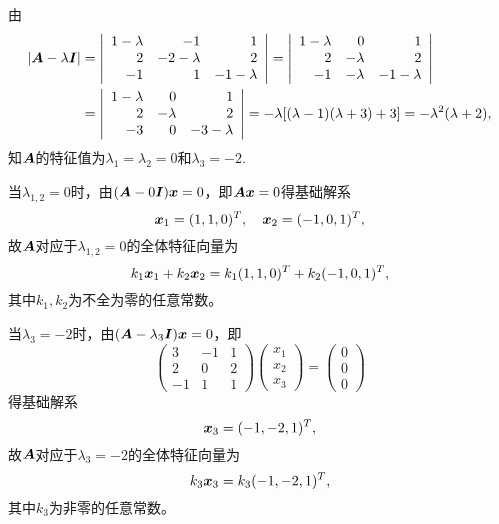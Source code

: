 \begin{frame}\ft{\subsecname}  

\begin{jie}
  由
  $$
  \begin{aligned}
    |\boldsymbol{A}-\lambda\boldsymbol{I}|&=\left|
      \begin{array}{rrr}
        1-\lambda&-1&1\\
        2&-2-\lambda&2\\
        -1&1&-1-\lambda
      \end{array}
  \right|=\left|
    \begin{array}{rrr}
      1-\lambda&0&1\\
        2&-\lambda&2\\
        -1&-\lambda&-1-\lambda
    \end{array}
  \right|\\
  &=\left|
    \begin{array}{rrr}
      1-\lambda&0&1\\
      2&-\lambda&2\\
      -3&0&-3-\lambda
    \end{array}
  \right|=-\lambda[(\lambda-1)(\lambda+3)+3]=-\lambda^2(\lambda+2),
\end{aligned}
$$
知$\boldsymbol{A}$的特征值为$\lambda_1=\lambda_2=0$和$\lambda_3=-2$.

当$\lambda_{1,2}=0$时，由$(\boldsymbol{A}-0\boldsymbol{I}){\boldsymbol{x}}=0$，即$\boldsymbol{A}{\boldsymbol{x}}=0$得基础解系
$$
{\boldsymbol{x}}_1=(1,1,0)^T, \quad {\boldsymbol{x}}_2=(-1,0,1)^T,
$$
故$\boldsymbol{A}$对应于$\lambda_{1,2}=0$的全体特征向量为
$$
k_1{\boldsymbol{x}}_1+k_2{\boldsymbol{x}}_2=k_1(1,1,0)^T+k_2(-1,0,1)^T,
$$
其中$k_1,k_2$为不全为零的任意常数。


当$\lambda_{3}=-2$时，由$(\boldsymbol{A}-\lambda_{3}\boldsymbol{I}){\boldsymbol{x}}=0$，即
$$
\left(
  \begin{array}{rrr}
    3&-1&1\\
    2&0&2\\
    -1&1&1
  \end{array}
\right)\left(
  \begin{array}{c}
    x_1\\x_2\\x_3
  \end{array}
\right)=\left(
  \begin{array}{c}
    0\\0\\0
  \end{array}
\right)
$$得基础解系
$$
{\boldsymbol{x}}_3=(-1,-2,1)^T,
$$
故$\boldsymbol{A}$对应于$\lambda_{3}=-2$的全体特征向量为
$$
k_3{\boldsymbol{x}}_3=k_3(-1,-2,1)^T,
$$
其中$k_3$为非零的任意常数。



\end{jie}
\end{frame}
